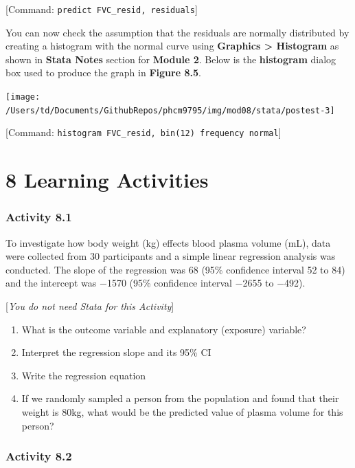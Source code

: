 \documentclass[
]{memoir}
\providecommand{\tightlist}{%
  \setlength{\itemsep}{0pt}\setlength{\parskip}{0pt}}
\begin{document}
{[}Command: \texttt{predict\ FVC\_resid,\ residuals}{]}

You can now check the assumption that the residuals are normally distributed by creating a histogram with the normal curve using \textbf{Graphics \textgreater{} Histogram} as shown in \textbf{Stata Notes} section for \textbf{Module 2}. Below is the \textbf{histogram} dialog box used to produce the graph in \textbf{Figure 8.5}.

\texttt{[image: /Users/td/Documents/GithubRepos/phcm9795/img/mod08/stata/postest-3]}

{[}Command: \texttt{histogram\ FVC\_resid,\ bin(12)\ frequency\ normal}{]}

\hypertarget{learning-activities-7}{%
\chapter*{\texorpdfstring{\textbf{8} Learning Activities}{8 Learning Activities}}\label{learning-activities-7}}

\hypertarget{activity-8.1}{%
\subsection*{Activity 8.1}\label{activity-8.1}}

To investigate how body weight (kg) effects blood plasma volume (mL), data were collected from 30 participants and a simple linear regression analysis was conducted. The slope of the regression was 68 (95\% confidence interval 52 to 84) and the intercept was −1570 (95\% confidence interval −2655 to −492).

{[}\emph{You do not need Stata for this Activity}{]}

\begin{enumerate}
\def\labelenumi{\alph{enumi})}
\tightlist
\item
  What is the outcome variable and explanatory (exposure) variable?
\item
  Interpret the regression slope and its 95\% CI
\item
  Write the regression equation
\item
  If we randomly sampled a person from the population and found that their weight is 80kg, what would be the predicted value of plasma volume for this person?
\end{enumerate}

\hypertarget{activity-8.2}{%
\subsection*{Activity 8.2}\label{activity-8.2}}
\end{document}
